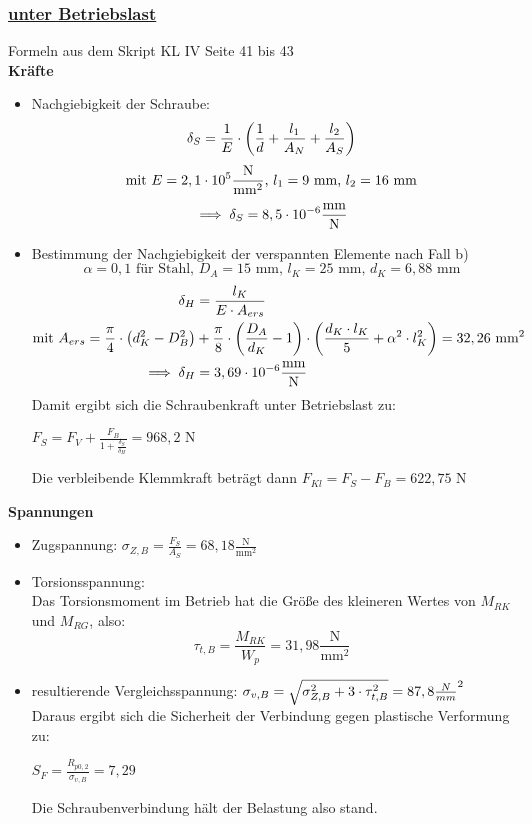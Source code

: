 \subsubsection{\underline{unter Betriebslast}}
Formeln aus dem Skript KL IV  Seite 41 bis 43 \\
\textbf{Kräfte}
\begin{itemize}
	\item Nachgiebigkeit der Schraube:
	\[\delta_S = \frac{1}{E}\cdot \left(\frac{1}{d}+\frac{l_1}{A_N}+\frac{l_2}{A_S}\right)\]
	\[\text{mit } E = 2,1\cdot 10^5 \frac{\text{N}}{\text{mm}^2} \text{, } l_1 = 9 \text{ mm, } l_2 = 16 \text{ mm}\]
	\[\implies \delta_S = 8,5\cdot 10^{-6} \frac{\text{mm}}{\text{N}}\]
	\item Bestimmung der Nachgiebigkeit der verspannten Elemente nach Fall b)
	\[\alpha = 0,1 \text{ für Stahl, } D_A = 15 \text{ mm, } l_K = 25 \text{ mm, }  d_K = 6,88 \text{ mm}\]
	\begin{align*}
	\delta_H &= \frac{l_K}{E\cdot A_{ers}}\\
	\text{mit } A_{ers} = \frac{\pi}{4}\cdot \left(d_K^2 -D_B^2\right) &+ \frac{\pi}{8}\cdot\left(\frac{D_A}{d_K}-1\right)\cdot\left(\frac{d_K\cdot l_K}{5}+ \alpha^2\cdot l_K^2\right) = 32,26 \text{ mm}^2\\
	\implies \delta_H &= 3,69\cdot 10^{-6} \frac{\text{mm}}{\text{N}}
	\end{align*}
	Damit ergibt sich die Schraubenkraft unter Betriebslast zu: \\
	\begin{center}
		$F_S = F_V+ \frac{F_B}{1+\frac{\delta_S}{\delta_H}} = 968,2 \text{ N}$
	\end{center}
	Die verbleibende Klemmkraft beträgt dann $ F_{Kl} = F_S-F_B = 622,75 \text{ N}$
\end{itemize}
\newpage
\textbf{Spannungen}
\begin{itemize}
	\item Zugspannung:
	$\sigma_{Z,B} = \frac{F_S}{A_S} = 68,18 \frac{\text{N}}{\text{mm}^2}$\\
	\item Torsionsspannung:\\
	\vspace{0.3cm}
	Das Torsionsmoment im Betrieb hat die Größe des kleineren Wertes von $M_{RK}$ und $M_{RG}$, also: 
	\[\tau_{t,B} = \frac{M_{RK}}{W_p} = 31,98 \frac{\text{N}}{\text{mm}^2}\]
	\item resultierende Vergleichsspannung: $\sigma_{v,B} = \sqrt{\sigma_{Z,B}^2+3\cdot \tau_{t,B}^2} = 87,8 \frac{N}{mm}^2$\\
	\vspace{.5cm}
	Daraus ergibt sich die Sicherheit der Verbindung gegen plastische Verformung zu: 
	\begin{center}
		$S_F = \frac{R_{p0,2}}{\sigma_{v,B}} = 7,29$
	\end{center}
	Die Schraubenverbindung hält der Belastung also stand.
\end{itemize}